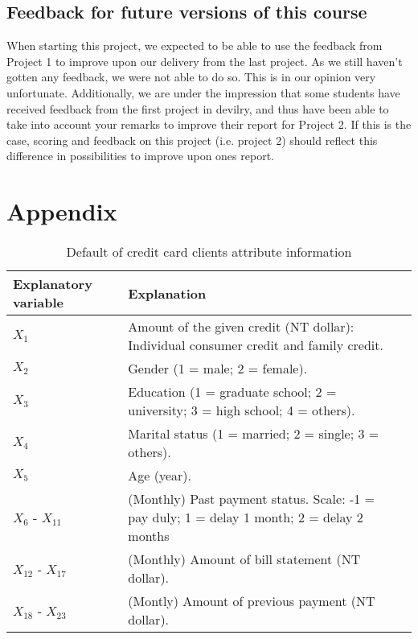 \documentclass[10pt, a4paper, twocolumn]{article}
\begin{document}
	\subsection{Feedback for future versions of this course}
		When starting this project, we expected to be able to use the feedback from Project 1 to improve upon our delivery from the last project. As we still haven't gotten any feedback, we were not able to do so. This is in our opinion very unfortunate. Additionally, we are under the impression that some students have received feedback from the first project in devilry, and thus have been able to take into account your remarks to improve their report for Project 2. If this is the case, scoring and feedback on this project (i.e. project 2) should reflect this difference in possibilities to improve upon ones report.
		
\onecolumn
\section{Appendix}
	\begin{table}
		\caption{Default of credit card clients attribute information}
			\begin{tabular}{@{}lll@{}} %
				\toprule
				Explanatory variable & Explanation \\ \midrule
				$X_1$ & Amount of the given credit (NT dollar): Individual consumer credit and family credit.\\
				$X_2$ & Gender (1 = male; 2 = female). \\
				$X_3$ & Education (1 = graduate school; 2 = university; 3 = high school; 4 = others).\\
				$X_4$ & Marital status (1 = married; 2 = single; 3 = others).\\
				$X_5$ & Age (year).\\				
				$X_6$ - $X_{11}$ & (Monthly) Past payment status. Scale: -1 = pay duly; 1 = delay 1 month; 2 = delay 2 months\\
				$X_{12}$ - $X_{17}$ & (Monthly) Amount of bill statement (NT dollar).\\
				$X_{18}$ - $X_{23}$ & (Montly) Amount of previous payment (NT dollar).\\ \bottomrule
		\end{tabular}%
	\end{table}	
\nocite{*}


\end{document}
